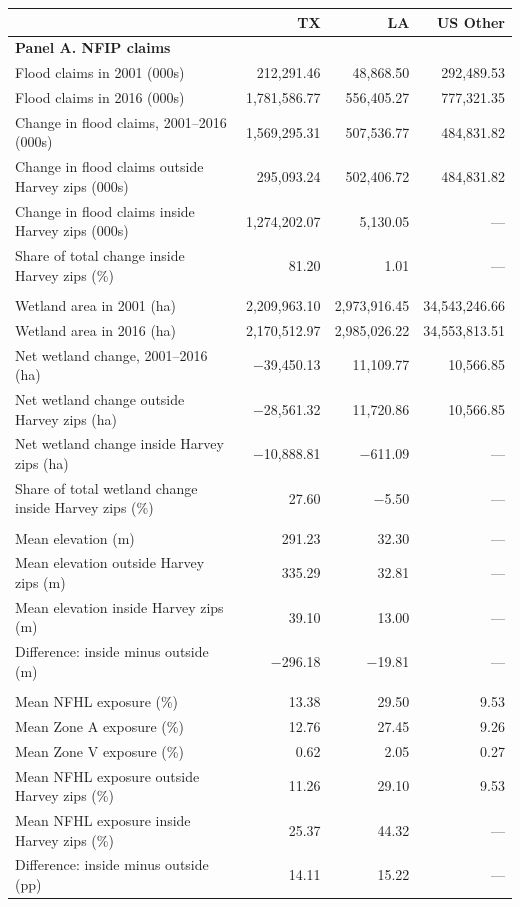 \begin{tabular}{lrrr}
\hline
\hline
 & TX & LA & US Other \\
\hline
\multicolumn{4}{l}{\textbf{Panel A. NFIP claims}} \\
Flood claims in 2001 (000s) & 212,291.46 & 48,868.50 & 292,489.53 \\
Flood claims in 2016 (000s) & 1,781,586.77 & 556,405.27 & 777,321.35 \\
Change in flood claims, 2001--2016 (000s) & 1,569,295.31 & 507,536.77 & 484,831.82 \\
Change in flood claims outside Harvey zips (000s) & 295,093.24 & 502,406.72 & 484,831.82 \\
Change in flood claims inside Harvey zips (000s) & 1,274,202.07 & 5,130.05 & — \\
Share of total change inside Harvey zips (\%) & 81.20 & 1.01 & — \\
\addlinespace
\multicolumn{4}{l}{\textbf{Panel B. Wetlands}} \\
Wetland area in 2001 (ha) & 2,209,963.10 & 2,973,916.45 & 34,543,246.66 \\
Wetland area in 2016 (ha) & 2,170,512.97 & 2,985,026.22 & 34,553,813.51 \\
Net wetland change, 2001--2016 (ha) & $-$39,450.13 & 11,109.77 & 10,566.85 \\
Net wetland change outside Harvey zips (ha) & $-$28,561.32 & 11,720.86 & 10,566.85 \\
Net wetland change inside Harvey zips (ha) & $-$10,888.81 & $-$611.09 & — \\
Share of total wetland change inside Harvey zips (\%) & 27.60 & $-$5.50 & — \\
\addlinespace
\multicolumn{4}{l}{\textbf{Panel C. Elevation}} \\
Mean elevation (m) & 291.23 & 32.30 & — \\
Mean elevation outside Harvey zips (m) & 335.29 & 32.81 & — \\
Mean elevation inside Harvey zips (m) & 39.10 & 13.00 & — \\
Difference: inside minus outside (m) & $-$296.18 & $-$19.81 & — \\
\addlinespace
\multicolumn{4}{l}{\textbf{Panel D. FEMA flood hazard}} \\
Mean NFHL exposure (\%) & 13.38 & 29.50 & 9.53 \\
Mean Zone A exposure (\%) & 12.76 & 27.45 & 9.26 \\
Mean Zone V exposure (\%) & 0.62 & 2.05 & 0.27 \\
Mean NFHL exposure outside Harvey zips (\%) & 11.26 & 29.10 & 9.53 \\
Mean NFHL exposure inside Harvey zips (\%) & 25.37 & 44.32 & — \\
Difference: inside minus outside (pp) & 14.11 & 15.22 & — \\
\hline
\hline
\end{tabular}
